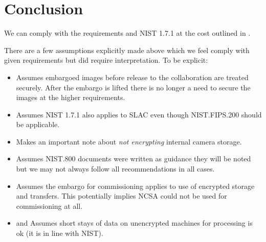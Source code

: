 \section{Conclusion}\label{sec:conc}
We can comply with the requirements and \gls{NIST} 1.7.1 at the cost outlined in .

There are a few assumptions explicitly made above which we feel comply with given requirements but did require interpretation. To be explicit:
\begin{itemize}
\item {} Assumes embargoed images before release to the collaboration are treated securely. After the embargo is lifted there is no longer a need to secure the images at the higher requirements.
\item {} Assumes NIST 1.7.1 also applies to \gls{SLAC} even though NIST.FIPS.200 should be applicable.
\item {} Makes an important note about \emph{not encrypting} internal \gls{camera} storage.
\item {} Assumes \gls{NIST}.800 documents were written as guidance  they will be noted but we may not always follow all recommendations in all cases.
\item {} Assumes the embargo for commissioning applies to use of encrypted storage and transfers. This potentially implies \gls{NCSA} could not be used for commissioning at all.
\item {} and  Assumes short stays of data on unencrypted machines for processing is ok (it is in line with \gls{NIST}).

\end{itemize}
